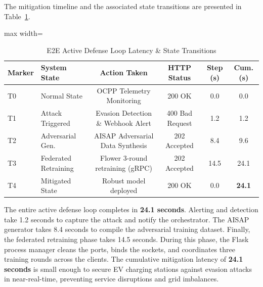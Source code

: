The mitigation timeline and the associated state transitions are presented in Table~\ref{tab:latency_timeline}.

\begin{table}[htbp]
\centering
\caption{E2E Active Defense Loop Latency \& State Transitions}
\label{tab:latency_timeline}
\begin{adjustbox}{max width=\columnwidth}
\begin{tabular}{llcccc}
\hline
\textbf{Marker} & \textbf{System State} & \textbf{Action Taken} & \textbf{HTTP Status} & \textbf{Step (s)} & \textbf{Cum. (s)} \\ \hline
T0 & Normal State & OCPP Telemetry Monitoring & 200 OK & 0.0 & 0.0 \\
T1 & Attack Triggered & Evasion Detection \& Webhook Alert & 400 Bad Request & 1.2 & 1.2 \\
T2 & Adversarial Gen. & AISAP Adversarial Data Synthesis & 202 Accepted & 8.4 & 9.6 \\
T3 & Federated Retraining & Flower 3-round retraining (gRPC) & 202 Accepted & 14.5 & 24.1 \\
T4 & Mitigated State & Robust model deployed & 200 OK & 0.0 & \textbf{24.1} \\ \hline
\end{tabular}
\end{adjustbox}
\end{table}

The entire active defense loop completes in \textbf{24.1 seconds}. Alerting and detection take 1.2 seconds to capture the attack and notify the orchestrator. The AISAP generator takes 8.4 seconds to compile the adversarial training dataset. Finally, the federated retraining phase takes 14.5 seconds. During this phase, the Flask process manager cleans the ports, binds the sockets, and coordinates three training rounds across the clients. The cumulative mitigation latency of \textbf{24.1 seconds} is small enough to secure EV charging stations against evasion attacks in near-real-time, preventing service disruptions and grid imbalances.
